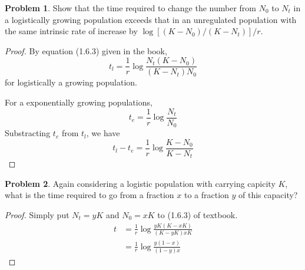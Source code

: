 \documentclass[12pt]{report}
\theoremstyle{definition}
\newtheorem{problem}{Problem}[chapter]
\begin{document}
        \begin{problem}
            Show that the time required to change the number from $N_0$ to $N_t$ in a logistically growing population exceeds that in an unregulated population with the same intrinsic rate of increase by $\log[(K-N_0)/(K-N_t)]/r$.
            \begin{proof}
                By equation (1.6.3) given in the book,
                \begin{equation*}
                    t_l = \frac{1}{r} \log \frac{N_t(K-N_0)}{(K-N_t)N_0}
                \end{equation*}
                for logistically a growing population.

                For a exponentially growing populations,
                \begin{equation*}
                    t_e = \frac{1}{r} \log \frac{N_t}{N_0}
                \end{equation*}
                Substracting $t_e$ from $t_l$, we have
                \begin{equation*}
                    t_l - t_e = \frac{1}{r} \log \frac{K-N_0}{K-N_t}
                \end{equation*}
            \end{proof}
        \end{problem}


        \begin{problem}
            Again considering a logistic population with carrying capicity $K$, what is the time required to go from a fraction $x$ to a fraction $y$ of this capacity?
            \begin{proof}
                Simply put $N_t = yK$ and $N_0 = xK$ to (1.6.3) of textbook.
                \begin{equation*}
                    \begin{split}
                        t &= \frac{1}{r} \log \frac{yK(K-xK)}{(K-yK)xK} \\
                        &= \frac{1}{r} \log \frac{y(1-x)}{(1-y)x}
                    \end{split}
                \end{equation*}
            \end{proof}
        \end{problem}
\end{document}
